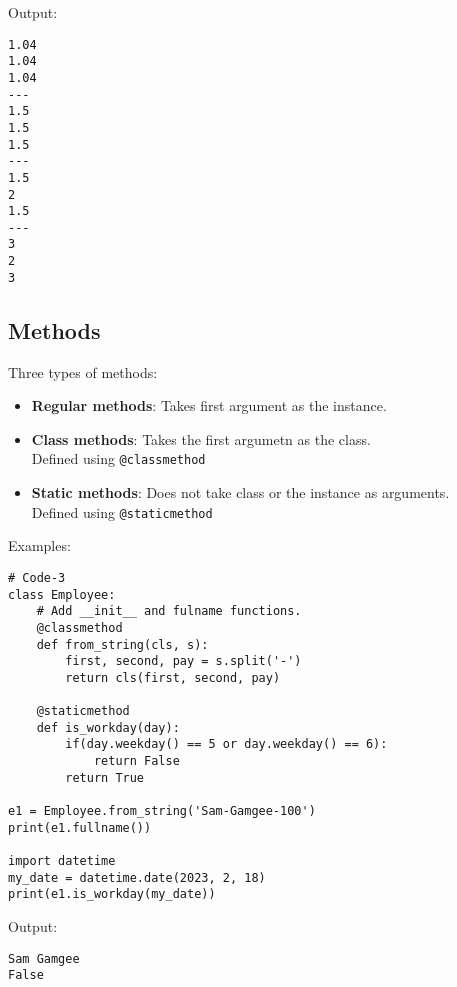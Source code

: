 Output:

\begin{mdframed}[backgroundcolor=magenta!10,linecolor=magenta]
\begin{verbatim}
1.04
1.04
1.04
---
1.5
1.5
1.5
---
1.5
2
1.5
---
3
2
3 
\end{verbatim}
\end{mdframed}

\subsection*{Methods}

Three types of methods:
\begin{itemize}
    \item \textbf{Regular methods}: Takes first argument as the instance.
    \item \textbf{Class methods}: Takes the first argumetn as the class.\\
    Defined using \verb!@classmethod!
    \item \textbf{Static methods}: Does not take class or the instance as arguments.\\
    Defined using \verb!@staticmethod!
\end{itemize}

Examples:

\begin{mdframed}[backgroundcolor=gray!10,linecolor=Firebrick4]
\begin{verbatim}
# Code-3
class Employee:
    # Add __init__ and fulname functions.
    @classmethod
    def from_string(cls, s):
        first, second, pay = s.split('-')
        return cls(first, second, pay)

    @staticmethod
    def is_workday(day):
        if(day.weekday() == 5 or day.weekday() == 6):
            return False
        return True

e1 = Employee.from_string('Sam-Gamgee-100')
print(e1.fullname())

import datetime
my_date = datetime.date(2023, 2, 18)
print(e1.is_workday(my_date))
\end{verbatim}
\end{mdframed}

Output:

\begin{mdframed}[backgroundcolor=magenta!10,linecolor=magenta]
\begin{verbatim}
Sam Gamgee
False 
\end{verbatim}
\end{mdframed}

